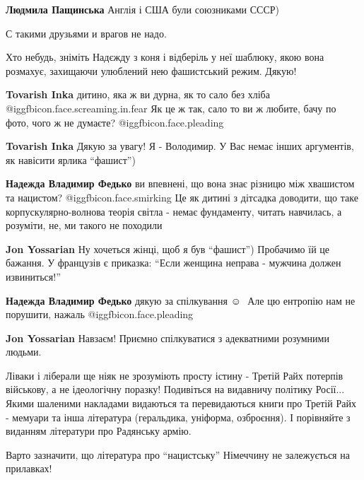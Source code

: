 \begin{itemize}
\begin{itemize} %
\textbf{Людмила Пащинська} Англія і США були союзниками СССР)

С такими друзьями и врагов не надо.
\end{itemize} %


Хто небудь, зніміть Надєжду з коня і відберіль у неї шаблюку, якою вона
розмахує, захищаючи улюблений нею фашистський режим. Дякую!

\begin{itemize} %
\textbf{Tovarish Inka} дитино, яка ж ви дурна, як то сало без хліба  @igg{fbicon.face.screaming.in.fear} 
Як це ж так, сало то ви ж любите, бачу по фото, чого ж не думаєте?  @igg{fbicon.face.pleading} 

\textbf{Tovarish Inka} Дякую за увагу! Я - Володимир. У Вас немає інших аргументів, як навісити ярлика \enquote{фашист})

\begin{itemize} %
\textbf{Надежда Владимир Федько} ви впевнені, що вона знає різницю між хвашистом та нацистом?  @igg{fbicon.face.smirking} 
Це як дитині з дітсадка доводити, що таке корпускулярно-волнова теорія світла - немає фундаменту, читать навчилась, а розуміти, не, ми такого не походили

\textbf{Jon Yossarian} Ну хочеться жінці, щоб я був \enquote{фашист}) Пробачимо їй це бажання.
У французів є приказка: \enquote{Если женщина неправа - мужчина должен извиниться!}

\textbf{Надежда Владимир Федько} дякую за спілкування  ☺ ️ 
Але цю ентропію нам не порушити, нажаль  @igg{fbicon.face.pleading} 

\textbf{Jon Yossarian} Навзаєм! Приємно спілкуватися з адекватними розумними людьми.


Ліваки і ліберали ще ніяк не зрозуміють просту істину - Третій Райх потерпів
військову, а не ідеологічну поразку! Подивіться на видавничу політику Росії...
Якими шаленими накладами видаються та перевидаються книги про Третій Райх -
мемуари та інша література (геральдика, уніформа, озброєння). І порівняйте з
виданням літератури про Радянську армію.

Варто зазначити, що література про \enquote{нацистську} Німеччину не залежується на
прилавках!


\end{itemize}
\end{itemize}
\end{itemize}
